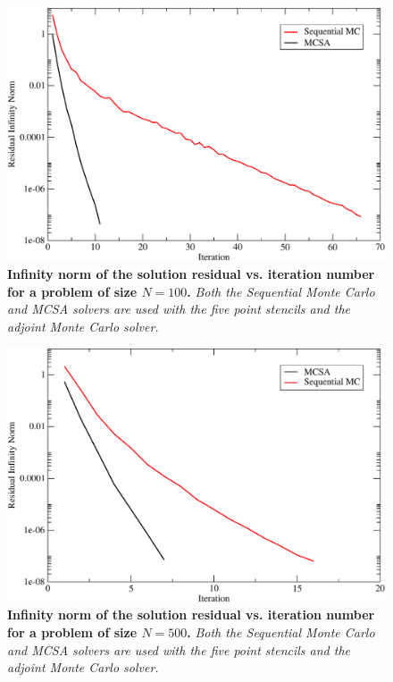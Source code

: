 \begin{figure}[ht!]
  \centering
  \includegraphics[width=5in,clip]{chapters/mc_background/seq_conv_100.pdf}
  \caption{\textbf{Infinity norm of the solution residual
      vs. iteration number for a problem of size $N=100$.}
    \textit{Both the Sequential Monte Carlo and MCSA solvers are used
      with the five point stencils and the adjoint Monte Carlo
      solver.}}
  \label{fig:seq_100}
\end{figure}

\begin{figure}[ht!]
  \centering
  \includegraphics[width=5in,clip]{chapters/mc_background/seq_conv_500.pdf}
  \caption{\textbf{Infinity norm of the solution residual
      vs. iteration number for a problem of size $N=500$.}
    \textit{Both the Sequential Monte Carlo and MCSA solvers are used
      with the five point stencils and the adjoint Monte Carlo
      solver.}}
  \label{fig:seq_500}
\end{figure}

